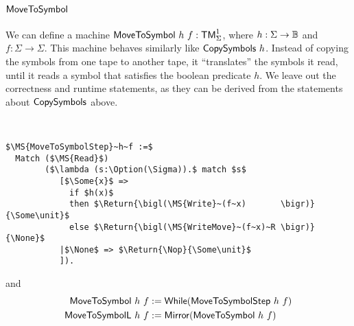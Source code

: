 \section{$\MS{MoveToSymbol}$}
\label{sec:MoveToSymbol}

We can define a machine $\mathsf{MoveToSymbol}~h~f : \mathsf{TM}_\Sigma^1$, where $h:\Sigma\rightarrow\mathbb{B}$ and $f:\Sigma\to\Sigma$.  This machine behaves similarly like
$\mathsf{CopySymbols}~h$.  Instead of copying the symbols from one tape to another tape, it ``translates'' the symbols it read, until it reads a
symbol that satisfies the boolean predicate $h$.  We leave out the correctness and runtime statements, as they can be derived from the statements
about $\mathsf{CopySymbols}$ above.

\begin{definition}[$\MS{MoveToSymbol}$]
  ~
\begin{lstlisting}[style=semicoqstyle]
$\MS{MoveToSymbolStep}~h~f :=$
  Match ($\MS{Read}$)
        ($\lambda (s:\Option(\Sigma)).$ match $s$
           [$\Some{x}$ => 
             if $h(x)$
             then $\Return{\bigl(\MS{Write}~(f~x)       \bigr)}{\Some\unit}$ 
             else $\Return{\bigl(\MS{WriteMove}~(f~x)~R \bigr)}{\None}$ 
           |$\None$ => $\Return{\Nop}{\Some\unit}$ 
           ]).
\end{lstlisting}
  and
  \begin{align*}
    \mathsf{MoveToSymbol }~h~f &:= \mathsf{While}(\mathsf{MoveToSymbolStep}~h~f) \\
    \mathsf{MoveToSymbolL}~h~f &:= \mathsf{Mirror}(\mathsf{MoveToSymbol}~h~f)
  \end{align*}
\end{definition}




